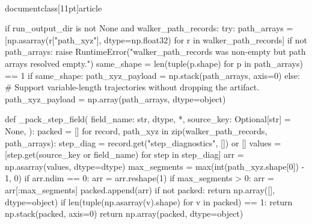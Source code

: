 \\documentclass[11pt]{article}
\begin{document}
\begin{CodeBlock}
        if run_output_dir is not None and walker_path_records:
            try:
                path_arrays = [np.asarray(r["path_xyz"], dtype=np.float32) for r in walker_path_records]
                if not path_arrays:
                    raise RuntimeError("walker_path_records was non-empty but path arrays resolved empty.")
                same_shape = len({tuple(p.shape) for p in path_arrays}) == 1
                if same_shape:
                    path_xyz_payload = np.stack(path_arrays, axis=0)
                else:
                    # Support variable-length trajectories without dropping the artifact.
                    path_xyz_payload = np.array(path_arrays, dtype=object)

                def _pack_step_field(
                    field_name: str,
                    dtype,
                    *,
                    source_key: Optional[str] = None,
                ):
                    packed = []
                    for record, path_xyz in zip(walker_path_records, path_arrays):
                        step_diag = record.get("step_diagnostics", []) or []
                        values = [step.get(source_key or field_name) for step in step_diag]
                        arr = np.asarray(values, dtype=dtype)
                        max_segments = max(int(path_xyz.shape[0]) - 1, 0)
                        if arr.ndim == 0:
                            arr = arr.reshape(1)
                        if max_segments > 0:
                            arr = arr[:max_segments]
                        packed.append(arr)
                    if not packed:
                        return np.array([], dtype=object)
                    if len({tuple(np.asarray(v).shape) for v in packed}) == 1:
                        return np.stack(packed, axis=0)
                    return np.array(packed, dtype=object)


\end{CodeBlock}
\end{document}
